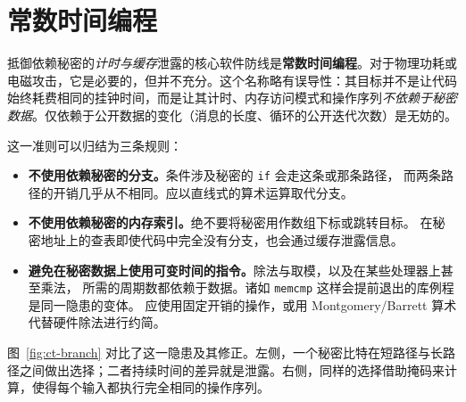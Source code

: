 \section{常数时间编程}

抵御依赖秘密的\emph{计时与缓存}泄露的核心软件防线是\textbf{常数时间编程}。对于物理功耗或电磁攻击，它是必要的，但并不充分。这个名称略有误导性：其目标并不是让代码始终耗费相同的挂钟时间，而是让其计时、内存访问模式和操作序列\emph{不依赖于秘密数据}。仅依赖于公开数据的变化（消息的长度、循环的公开迭代次数）是无妨的。

这一准则可以归结为三条规则：

\begin{itemize}
  \item \textbf{不使用依赖秘密的分支。}条件涉及秘密的 \texttt{if} 会走这条或那条路径，
        而两条路径的开销几乎从不相同。应以直线式的算术运算取代分支。
  \item \textbf{不使用依赖秘密的内存索引。}绝不要将秘密用作数组下标或跳转目标。
        在秘密地址上的查表即使代码中完全没有分支，也会通过缓存泄露信息。
  \item \textbf{避免在秘密数据上使用可变时间的指令。}除法与取模，以及在某些处理器上甚至乘法，
        所需的周期数都依赖于数据。诸如 \texttt{memcmp} 这样会提前退出的库例程是同一隐患的变体。
        应使用固定开销的操作，或用 Montgomery/Barrett 算术代替硬件除法进行约简。
\end{itemize}

图~\ref{fig:ct-branch} 对比了这一隐患及其修正。左侧，一个秘密比特在短路径与长路径之间做出选择；二者持续时间的差异就是泄露。右侧，同样的选择借助掩码来计算，使得每个输入都执行完全相同的操作序列。

